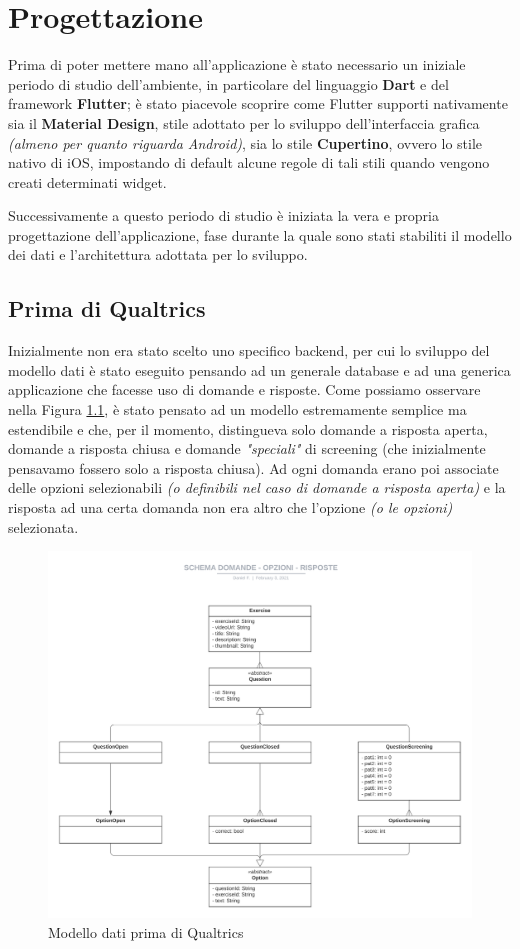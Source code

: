 \chapter{Progettazione}
Prima di poter mettere mano all'applicazione è stato necessario un iniziale periodo di studio dell'ambiente, in particolare del linguaggio \textbf{Dart} e del framework \textbf{Flutter}; è stato piacevole scoprire come Flutter supporti nativamente sia il \textbf{Material Design}, stile adottato per lo sviluppo dell'interfaccia grafica \textit{(almeno per quanto riguarda Android)}, sia lo stile \textbf{Cupertino}, ovvero lo stile nativo di iOS, impostando di default alcune regole di tali stili quando vengono creati determinati widget.

Successivamente a questo periodo di studio è iniziata la vera e propria progettazione dell'applicazione, fase durante la quale sono stati stabiliti il modello dei dati e l'architettura adottata per lo sviluppo.

\section{Prima di Qualtrics}
Inizialmente non era stato scelto uno specifico backend, per cui lo sviluppo del modello dati è stato eseguito pensando ad un generale database e ad una generica applicazione che facesse uso di domande e risposte. Come possiamo osservare nella Figura \ref{fig:modello_iniziale}, è stato pensato ad un modello estremamente semplice ma estendibile e che, per il momento, distingueva solo domande a risposta aperta, domande a risposta chiusa e domande \textit{"speciali"} di screening (che inizialmente pensavamo fossero solo a risposta chiusa).
Ad ogni domanda erano poi associate delle opzioni selezionabili \textit{(o definibili nel caso di domande a risposta aperta)} e la risposta ad una certa domanda non era altro che l'opzione \textit{(o le opzioni)} selezionata.

\begin{figure}
\centering
\includegraphics[width=\textwidth]{img/modello_iniziale}
\caption{Modello dati prima di Qualtrics}
\label{fig:modello_iniziale}
\end{figure}

